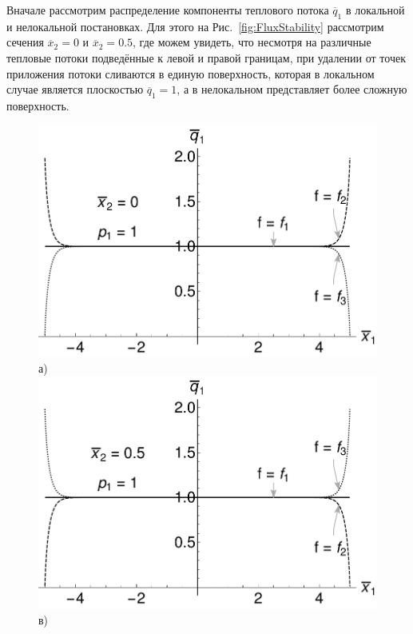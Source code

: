 Вначале рассмотрим распределение компоненты теплового потока $\overline{q}_1$ в локальной и нелокальной постановках. Для этого на Рис.~\ref{fig:FluxStability} рассмотрим сечения $\overline{x}_2 = 0$ и $\overline{x}_2 = 0.5$, где можем увидеть, что несмотря на различные тепловые потоки подведённые к левой и правой границам, при удалении от точек приложения потоки сливаются в единую поверхность, которая в локальном случае является плоскостью $\overline{q}_1 = 1$, а в нелокальном представляет более сложную поверхность.

\begin{figure}[ht]
    \begin{minipage}[b][][b]{0.49\linewidth}\centering
        \includegraphics[width=\linewidth]{pics/FluxStabilityX0P1.pdf} \\ а)
        \includegraphics[width=\linewidth]{pics/FluxStabilityX05P1.pdf} \\ в)

\end{minipage}
\end{figure}
